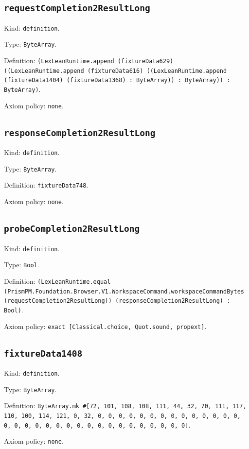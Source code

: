 \documentclass[11pt]{article}
\begin{document}
\subsection*{\texttt{requestCompletion2ResultLong}}
\noindent Kind: \texttt{definition}.\par
\noindent Type: \texttt{ByteArray}.\par
\noindent Definition: \texttt{(LexLeanRuntime.append (fixtureData629) ((LexLeanRuntime.append (fixtureData616) ((LexLeanRuntime.append (fixtureData1404) (fixtureData1368) : ByteArray)) : ByteArray)) : ByteArray)}.\par
\noindent Axiom policy: \texttt{none}.\par
\subsection*{\texttt{responseCompletion2ResultLong}}
\noindent Kind: \texttt{definition}.\par
\noindent Type: \texttt{ByteArray}.\par
\noindent Definition: \texttt{fixtureData748}.\par
\noindent Axiom policy: \texttt{none}.\par
\subsection*{\texttt{probeCompletion2ResultLong}}
\noindent Kind: \texttt{definition}.\par
\noindent Type: \texttt{Bool}.\par
\noindent Definition: \texttt{(LexLeanRuntime.equal (PrismPM.Foundation.Browser.V1.WorkspaceCommand.workspaceCommandBytes (requestCompletion2ResultLong)) (responseCompletion2ResultLong) : Bool)}.\par
\noindent Axiom policy: \texttt{exact [Classical.choice, Quot.sound, propext]}.\par
\subsection*{\texttt{fixtureData1408}}
\noindent Kind: \texttt{definition}.\par
\noindent Type: \texttt{ByteArray}.\par
\noindent Definition: \texttt{ByteArray.mk \#[72, 101, 108, 108, 111, 44, 32, 70, 111, 117, 110, 100, 114, 121, 0, 32, 0, 0, 0, 0, 0, 0, 0, 0, 0, 0, 0, 0, 0, 0, 0, 0, 0, 0, 0, 0, 0, 0, 0, 0, 0, 0, 0, 0, 0, 0, 0, 0]}.\par
\noindent Axiom policy: \texttt{none}.\par
\end{document}
